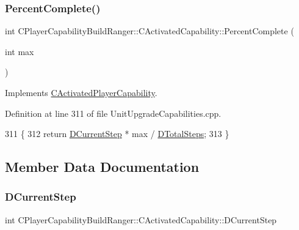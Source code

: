 \subsubsection{\texorpdfstring{Percent\+Complete()}{PercentComplete()}}
{\footnotesize\ttfamily int C\+Player\+Capability\+Build\+Ranger\+::\+C\+Activated\+Capability\+::\+Percent\+Complete (\begin{DoxyParamCaption}\item[{int}]{max }\end{DoxyParamCaption})\hspace{0.3cm}{\ttfamily [virtual]}}



Implements \hyperlink{classCActivatedPlayerCapability_a405dc6076058006a4f801727de4cfe4d}{C\+Activated\+Player\+Capability}.



Definition at line 311 of file Unit\+Upgrade\+Capabilities.\+cpp.


\begin{DoxyCode}
311                                                                             \{
312     \textcolor{keywordflow}{return} \hyperlink{classCPlayerCapabilityBuildRanger_1_1CActivatedCapability_a27be6f32606ef0dcc31ec42e0504611c}{DCurrentStep} * max / \hyperlink{classCPlayerCapabilityBuildRanger_1_1CActivatedCapability_a322dd429ae588ed82febdcf459232bee}{DTotalSteps};
313 \}
\end{DoxyCode}


\subsection{Member Data Documentation}
\hypertarget{classCPlayerCapabilityBuildRanger_1_1CActivatedCapability_a27be6f32606ef0dcc31ec42e0504611c}{}\label{classCPlayerCapabilityBuildRanger_1_1CActivatedCapability_a27be6f32606ef0dcc31ec42e0504611c} 
\subsubsection{\texorpdfstring{D\+Current\+Step}{DCurrentStep}}
{\footnotesize\ttfamily int C\+Player\+Capability\+Build\+Ranger\+::\+C\+Activated\+Capability\+::\+D\+Current\+Step\hspace{0.3cm}{\ttfamily [protected]}}



